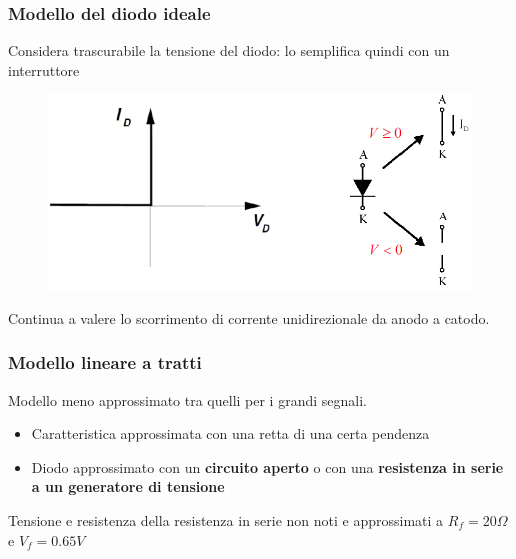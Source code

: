 \documentclass[11pt,a4paper,]{article}
\begin{document}
\subsubsection{Modello del diodo ideale}
Considera trascurabile la tensione del diodo: lo semplifica quindi con un interruttore
\begin{figure}[H]
    \centering
    \includegraphics[width=0.5\linewidth]{img/diodo idea.png}
\end{figure}
\begin{nota}
    Continua a valere lo scorrimento di corrente unidirezionale da anodo a catodo.
\end{nota}
\subsubsection{Modello lineare a tratti}
\begin{nota}
    Modello meno approssimato tra quelli per i grandi segnali.
\end{nota}
\begin{itemize}
    \item Caratteristica approssimata con una retta di una certa pendenza
    \item Diodo approssimato con un \textbf{circuito aperto} o con una \textbf{resistenza in serie a un generatore di tensione}
\end{itemize}
\begin{nota}
    Tensione e resistenza della resistenza in serie non noti e approssimati a $R_f=20\Omega$ e $V_f=0.65V$
\end{nota}
\end{document}
